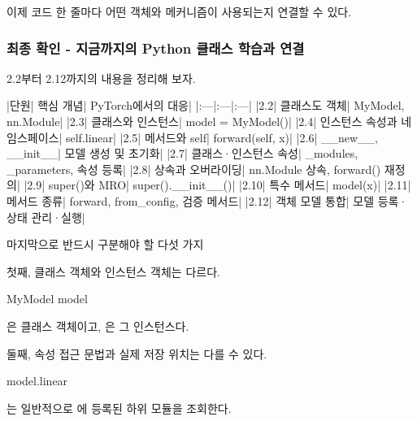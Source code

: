 이제 코드 한 줄마다 어떤 객체와 메커니즘이 사용되는지 연결할 수 있다.

\subsubsection{최종 확인 - 지금까지의 Python 클래스 학습과 연결}

2.2부터 2.12까지의 내용을 정리해 보자.

\begin{dhktable}
|단원|	핵심 개념|	PyTorch에서의 대응|
|:---|:---|:---|
|2.2|	클래스도 객체|	MyModel, nn.Module|
|2.3|	클래스와 인스턴스|	model = MyModel()|
|2.4|	인스턴스 속성과 네임스페이스|	self.linear|
|2.5|	메서드와 self|	forward(self, x)|
|2.6|	__new__, __init__|	모델 생성 및 초기화|
|2.7|	클래스·인스턴스 속성|	_modules, _parameters, 속성 등록|
|2.8|	상속과 오버라이딩|	nn.Module 상속, forward() 재정의|
|2.9|	super()와 MRO|	super().__init__()|
|2.10|	특수 메서드|	model(x)|
|2.11|	메서드 종류|	forward, from_config, 검증 메서드|
|2.12|	객체 모델 통합|	모델 등록·상태 관리·실행|
\end{dhktable}

\begin{dhknote}
\begin{dhksmry}[centered]
마지막으로 반드시 구분해야 할 다섯 가지
\end{dhksmry}
\end{dhknote}

\begin{dhknote}
\begin{dhksmry}[centered]
첫째, 클래스 객체와 인스턴스 객체는 다르다.
\end{dhksmry}
\end{dhknote}

\begin{dhkcode}
MyModel
model
\end{dhkcode}

은 클래스 객체이고, 은 그 인스턴스다.

\begin{dhknote}
\begin{dhksmry}[centered]
둘째, 속성 접근 문법과 실제 저장 위치는 다를 수 있다.
\end{dhksmry}
\end{dhknote}

\begin{dhkcode}
model.linear
\end{dhkcode}

는 일반적으로 에 등록된 하위 모듈을 조회한다.

